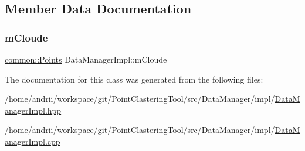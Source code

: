 \subsection{Member Data Documentation}
\mbox{\label{classDataManagerImpl_a24c28355207eb567a68814641d1549ee}} 
\subsubsection{\texorpdfstring{m\+Cloude}{mCloude}}
{\footnotesize\ttfamily \mbox{\hyperlink{namespacecommon_a1aefa0cce5e127612ab7ca981276ab7e}{common\+::\+Points}} Data\+Manager\+Impl\+::m\+Cloude\hspace{0.3cm}{\ttfamily [private]}}



The documentation for this class was generated from the following files\+:\begin{DoxyCompactItemize}
\item 
/home/andrii/workspace/git/\+Point\+Clastering\+Tool/src/\+Data\+Manager/impl/\mbox{\hyperlink{DataManagerImpl_8hpp}{Data\+Manager\+Impl.\+hpp}}\item 
/home/andrii/workspace/git/\+Point\+Clastering\+Tool/src/\+Data\+Manager/impl/\mbox{\hyperlink{DataManagerImpl_8cpp}{Data\+Manager\+Impl.\+cpp}}\end{DoxyCompactItemize}
